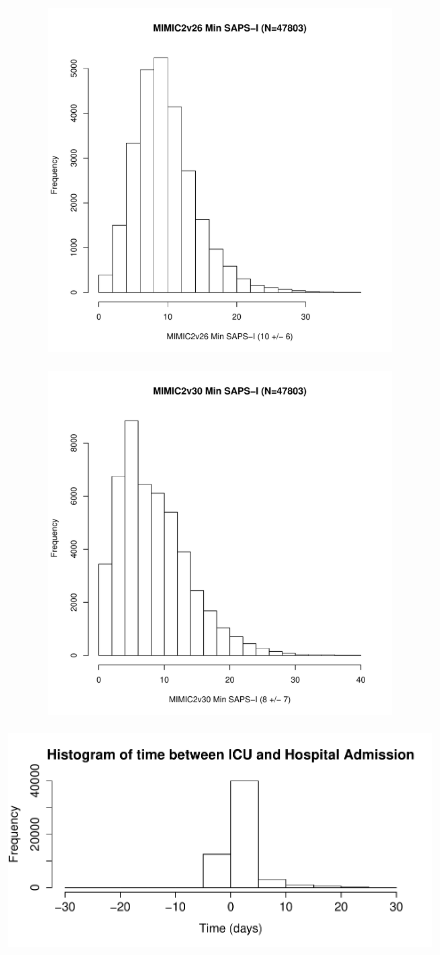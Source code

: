 \documentclass[10pt]{article}
\begin{document}
\begin{figure}
        \begin{subfigure}[b]{0.5\textwidth}
                \includegraphics[width=\linewidth]{../../figure/fig_hist_sapsi_min_mimic2v26.pdf}
        \end{subfigure}%
        \begin{subfigure}[b]{0.5\textwidth}
                \includegraphics[width=\linewidth]{../../figure/fig_hist_sapsi_min_mimic2v30.pdf}
        \end{subfigure}
\end{figure}


\begin{figure}
\includegraphics[width=0.45\linewidth]{../../figure/hist_hadm_dt.pdf}
\end{figure}
\end{document}
